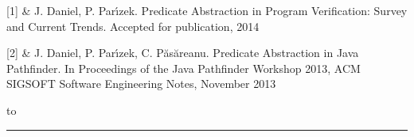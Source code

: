 {{    [1] & J. Daniel, P. Par\'{\i}zek. Predicate Abstraction in Program Verification: Survey and Current Trends. Accepted for publication, 2014 \cr

    \cr

    [2] & J. Daniel, P. Par\'{\i}zek, C. P\u{a}s\u{a}reanu. Predicate Abstraction in Java Pathfinder. In Proceedings of the Java Pathfinder Workshop 2013, ACM SIGSOFT Software Engineering Notes, November 2013 \cr
  }
  \vsep
  \vfil
  \halign to 
  \vfil
  \vsep
  \hrule
}

\bye

